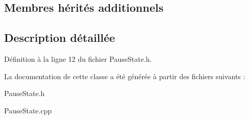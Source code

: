 \subsection*{Membres hérités additionnels}


\subsection{Description détaillée}


Définition à la ligne 12 du fichier Pause\+State.\+h.



La documentation de cette classe a été générée à partir des fichiers suivants \+:\begin{DoxyCompactItemize}
\item 
Pause\+State.\+h\item 
Pause\+State.\+cpp\end{DoxyCompactItemize}

